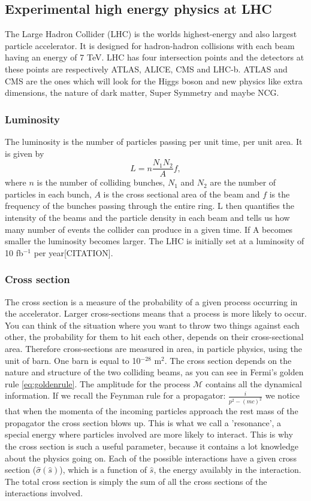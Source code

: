 \subsection{Experimental high energy physics at LHC}
The Large Hadron Collider (LHC) is the worlds highest-energy and also largest particle accelerator. It is designed for hadron-hadron collisions with each beam having an energy of 7 TeV. LHC has four intersection points and the detectors at these points are respectively ATLAS, ALICE, CMS and LHC-b. ATLAS and CMS are the ones which will look for the Higgs boson and new physics like extra dimensions, the nature of dark matter, Super Symmetry and maybe NCG. 

\subsubsection{Luminosity}
The luminosity is the number of particles passing per unit time, per unit area. It is given by
\begin{equation}
L=n\frac{N_{1}N_{2}}{A}f,
\end{equation}
where $n$ is the number of colliding bunches, $N_{1}$ and $N_{2}$ are the number of particles in each bunch, $A$ is the cross sectional area of the beam and $f$ is the frequency of the bunches passing through the entire ring. L then quantifies the intensity of the beams and the particle density in each beam and tells us how many number of events the collider can produce in a given time. If A becomes smaller the luminosity becomes larger. The LHC is initially set at a luminosity of 10 fb$^{-1}$ per year[CITATION].

\subsubsection{Cross section}
The cross section is a measure of the probability of a given process occurring in the accelerator. Larger cross-sections means that a process is more likely to occur. You can think of the situation where you want to throw two things against each other, the probability for them to hit each other, depends on their cross-sectional area. Therefore cross-sections are measured in area, in particle physics, using the unit of barn. One barn is equal to 10$^{-28}$ m$^{2}$.
The cross section depends on the nature and structure of the two colliding beams, as you can see in Fermi's golden rule \eqref{eq:goldenrule}. The amplitude for the process $\mathcal{M}$ contains all the dynamical information. If we recall the Feynman rule for a propagator: $\frac{i}{p^{2}-(mc)^{2}}$ we notice that when the momenta of the incoming particles approach the rest mass of the propagator the cross section blows up. This is what we call a 'resonance', a special energy where particles involved are more likely to interact. This is why the cross section is such a useful parameter, because it contains a lot knowledge about the physics going on. Each of the possible interactions have a given cross section ($\hat \sigma(\hat s)$), which is a function of $\hat s$, the energy availably in the interaction. The total cross section is simply the sum of all the cross sections of the interactions involved\cite{griffiths1987iep}.

